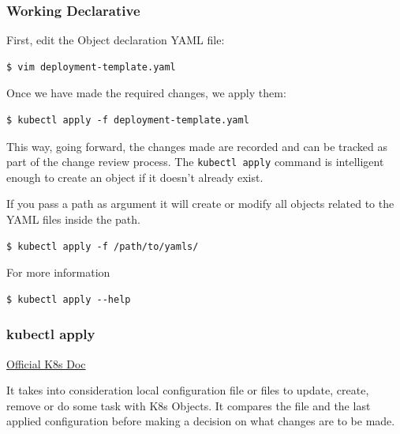 \documentclass{article}
\newenvironment{codetemplate}[1][]{%
  \mybasecolorbox[#1]
  \itshape
}{%
  \endmybasecolorbox
}
\begin{document}
\subsubsection{Working Declarative}

First, edit the Object declaration YAML file:
\begin{codetemplate}{}
\begin{verbatim}
$ vim deployment-template.yaml
\end{verbatim}
\end{codetemplate}

Once we have made the required changes, we apply them:
\begin{codetemplate}{}
\begin{verbatim}
$ kubectl apply -f deployment-template.yaml
\end{verbatim}
\end{codetemplate}

This way, going forward, the changes made are recorded and can be tracked as part of the change review process. The \verb|kubectl apply| command is intelligent enough to create an object if it doesn't already exist.

If you pass a path as argument it will create or modify all objects related to the YAML files inside the path.

\begin{codetemplate}{}
\begin{verbatim}
$ kubectl apply -f /path/to/yamls/
\end{verbatim}
\end{codetemplate}

For more information
\begin{codetemplate}{}
\begin{verbatim}
$ kubectl apply --help
\end{verbatim}
\end{codetemplate}

\subsubsection{kubectl apply}

\href{https://jamesdefabia.github.io/docs/user-guide/kubectl/kubectl_apply/}{Official K8s Doc}

It takes into consideration local configuration file or files to update, create, remove or do some task with K8s Objects. It compares the file and the last applied configuration before making a decision on what changes are to be made.
\end{document}
